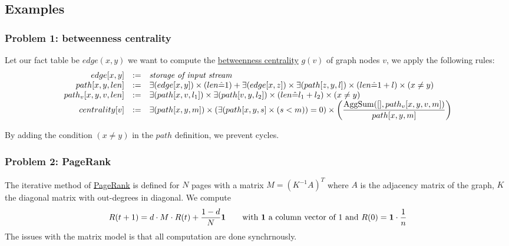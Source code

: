 \documentclass[10pt]{article}
\begin{document}
\subsection*{Examples}
\subsubsection*{Problem 1: betweenness centrality}
Let our fact table be $edge(x,y)$ we want to compute the \href{http://en.wikipedia.org/wiki/Betweenness_centrality}{betweenness centrality} $g(v)$ of graph nodes $v$, we apply the following rules:
\[\begin{array}{rcl}
edge[x,y] & := & \text{\it storage of input stream} \\
path[x,y,len] & := & \exists(edge[x,y]) \times (len\hat= 1) +  \exists(edge[x,z]) \times \exists(path[z,y,l]) \times (len\hat= 1+l) \times (x\ne y)\\
path_v[x,y,v,len] & := & \exists(path[x,v,l_1]) \times \exists(path[v,y,l_2]) \times (len\hat= l_1+l_2) \times (x\ne y) \\
centrality[v] & := & \exists(path[x,y,m]) \times (\exists(path[x,y,s] \times (s<m)) = 0) \times \left(\dfrac{{\rm AggSum}([], path_v[x,y,v,m])}{path[x,y,m]}\right)
\end{array}\]

By adding the condition $(x\ne y )$ in the $path$ definition, we prevent cycles.

\subsubsection*{Problem 2: PageRank}
The iterative method of \href{http://en.wikipedia.org/wiki/PageRank#Iterative}{PageRank} is defined for $N$ pages with a matrix $M=(K^{-1} A)^T$ where $A$ is the adjacency matrix of the graph, $K$ the diagonal matrix with out-degrees in diagonal. We compute \[R(t+1)=d\cdot M\cdot R(t)+\dfrac{1-d}{N}{\bf 1} \qquad \text{with {\bf 1} a column vector of 1 and }R(0)={\bf 1}\cdot \frac{1}{n}\]
The issues with the matrix model is that all computation are done synchrnously.
\end{document}
